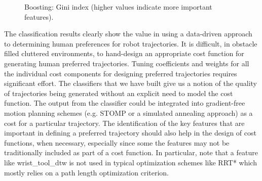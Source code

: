\documentclass[letterpaper, 10 pt, conference]{ieeeconf}  %
\begin{document}
\begin{figure}[t]
  \caption{Boosting: Gini index (higher values indicate more important features).}
\label{fig:gini_boosting}
\vspace{-0.3in}
\end{figure}

The classification results clearly show the value in using a data-driven approach to determining human preferences for robot trajectories. It is difficult, 
in obstacle filled cluttered environments, to hand-design an appropriate cost function for generating human preferred trajectories. Tuning coefficients 
and weights for all the individual cost components for designing preferred trajectories requires significant effort. 
The classifiers that we have built give us a notion of the quality of trajectories 
being generated without an explicit need to model the cost function. The output from the classifier could be integrated into gradient-free motion planning schemes 
(e.g. STOMP or a simulated annealing approach) as a cost for a particular trajectory. The identification of the key features that are important in defining a preferred trajectory 
should also help in the design of cost functions, when necessary, especially since some the features may not be traditionally included as part of a cost function. 
In particular, note that a feature like wrist\_tool\_dtw is not used in typical optimization schemes like RRT* which mostly relies on a path length optimization criterion. 
\end{document}
